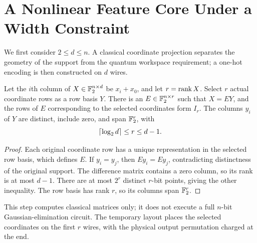 \section{A Nonlinear Feature Core Under a Width Constraint}\label{sec:core}
We first consider $2\le d\le n$. A classical coordinate projection separates the geometry of the support from the quantum workspace requirement; a one-hot encoding is then constructed on $d$ wires.

\begin{lemma}\label{lem:projection}
Let the $i$th column of $X\in\mathbb F_2^{n\times d}$ be $x_i+x_0$, and let $r=\operatorname{rank} X$. Select $r$ actual coordinate rows as a row basis $Y$. There is an $E\in\mathbb F_2^{n\times r}$ such that $X=EY$, and the rows of $E$ corresponding to the selected coordinates form $I_r$. The columns $y_i$ of $Y$ are distinct, include zero, and span $\mathbb F_2^r$, with
\begin{equation}\label{eq:rankwindow}
\left\lceil \log_2d\right\rceil\le r\le d-1.
\end{equation}
\end{lemma}
\begin{proof}
Each original coordinate row has a unique representation in the selected row basis, which defines $E$. If $y_i=y_j$, then $Ey_i=Ey_j$, contradicting distinctness of the original support. The difference matrix contains a zero column, so its rank is at most $d-1$. There are at most $2^r$ distinct $r$-bit points, giving the other inequality. The row basis has rank $r$, so its columns span $\mathbb F_2^r$.
\end{proof}
This step computes classical matrices only; it does not execute a full $n$-bit Gaussian-elimination circuit. The temporary layout places the selected coordinates on the first $r$ wires, with the physical output permutation charged at the end.

